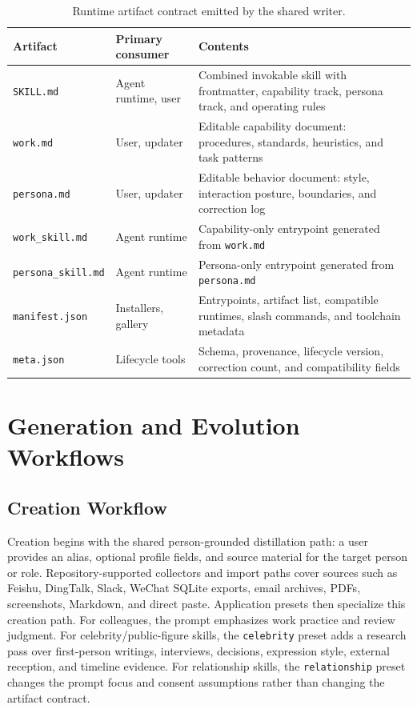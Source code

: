 \documentclass{llmxive}
\begin{document}
\begin{table}[t]
\centering
\small
\begin{tabularx}{\textwidth}{@{}l l X@{}}
\toprule
Artifact & Primary consumer & Contents \\
\midrule
\texttt{SKILL.md} & Agent runtime, user & Combined invokable skill with frontmatter, capability track, persona track, and operating rules \\
\texttt{work.md} & User, updater & Editable capability document: procedures, standards, heuristics, and task patterns \\
\texttt{persona.md} & User, updater & Editable behavior document: style, interaction posture, boundaries, and correction log \\
\texttt{work\_skill.md} & Agent runtime & Capability-only entrypoint generated from \texttt{work.md} \\
\texttt{persona\_skill.md} & Agent runtime & Persona-only entrypoint generated from \texttt{persona.md} \\
\texttt{manifest.json} & Installers, gallery & Entrypoints, artifact list, compatible runtimes, slash commands, and toolchain metadata \\
\texttt{meta.json} & Lifecycle tools & Schema, provenance, lifecycle version, correction count, and compatibility fields \\
\bottomrule
\end{tabularx}
\caption{Runtime artifact contract emitted by the shared writer.}
\label{tab:artifact-contract}
\end{table}

\section{Generation and Evolution Workflows}

\subsection{Creation Workflow}

Creation begins with the shared person-grounded distillation path: a user provides an alias, optional profile fields, and source material for the target person or role. Repository-supported collectors and import paths cover sources such as Feishu, DingTalk, Slack, WeChat SQLite exports, email archives, PDFs, screenshots, Markdown, and direct paste. Application presets then specialize this creation path. For colleagues, the prompt emphasizes work practice and review judgment. For celebrity/public-figure skills, the \texttt{celebrity} preset adds a research pass over first-person writings, interviews, decisions, expression style, external reception, and timeline evidence. For relationship skills, the \texttt{relationship} preset changes the prompt focus and consent assumptions rather than changing the artifact contract.
\end{document}
